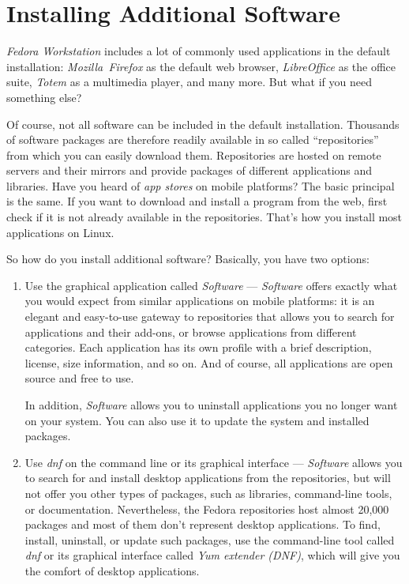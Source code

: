 \section*{Installing Additional Software}

\emph{Fedora Workstation} includes a lot of commonly used applications in the default installation: \emph{Mozilla~Firefox} as the default web browser, \emph{LibreOffice} as the office suite, \emph{Totem} as a multimedia player, and many more. But what if you need something else?

Of course, not all software can be included in the default installation. Thousands of software packages are therefore readily available in so called \enquote{repositories} from which you can easily download them. Repositories are hosted on remote servers and their mirrors and provide packages of different applications and libraries. Have you heard of \emph{app stores} on mobile platforms? The basic principal is the same. If you want to download and install a program from the web, first check if it is not already available in the repositories. That's how you install most applications on Linux.

So how do you install additional software? Basically, you have two options:
\begin{enumerate}
\item Use the graphical application called \emph{Software} --- \emph{Software} offers exactly what you would expect from similar applications on mobile platforms: it is an elegant and easy-to-use gateway to repositories that allows you to search for applications and their add-ons, or browse applications from different categories. Each application has its own profile with a brief description, license, size information, and so on. And of course, all applications are open source and free to use.

In addition, \emph{Software} allows you to uninstall applications you no longer want on your system. You can also use it to update the system and installed packages.


\item Use \emph{dnf} on the command line or its graphical interface  --- \emph{Software} allows you to search for and install desktop applications from the repositories, but will not offer you other types of packages, such as libraries, command-line tools, or documentation. Nevertheless, the Fedora repositories host almost 20,000 packages and most of them don't represent desktop applications. To find, install, uninstall, or update such packages, use the command-line tool called \emph{dnf} or its graphical interface called \emph{Yum extender (DNF)}, which will give you the comfort of desktop applications.
\end{enumerate}

